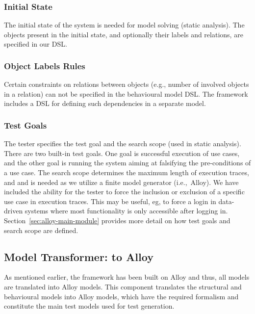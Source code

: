 \subsubsection{Initial State} 
\label{sec:framework-overview-initial}
The initial state of the system is needed for model solving (static analysis). The objects present in the initial state, and optionally their labels and relations, are specified in our DSL.

\subsubsection{Object Labels Rules}
\label{sec:framework-overview-rules}
Certain constraints on relations between objects (e.g., number of involved objects in a relation) can not be specified in the behavioural model DSL. The framework includes a DSL for defining such dependencies in a separate model.

\subsubsection{	Test Goals}
The tester specifies the test goal and the search scope (used in static analysis). There are two built-in test goals. One goal is successful execution of use cases, and the other goal is running the system aiming at falsifying the pre-conditions of a use case.
The search scope determines the maximum length of execution traces, and and is needed as we utilize a finite model generator (i.e.,\ Alloy).  We have included the ability for the tester to force the inclusion or exclusion of a specific use case in execution traces. This may be useful, eg, to force a login in data-driven systems where most functionality is only accessible after logging in. Section~\ref{sec:alloy-main-module} provides more detail on how test goals and search scope are defined.



\subsection{Model Transformer: to Alloy}
\label{sec:framework-overview-model-transformer}
As mentioned earlier, the framework has been built on Alloy and thus, all models are translated into Alloy models. This component translates the structural and behavioural models into Alloy models, which have the required formalism and constitute the main test models used for test generation.


